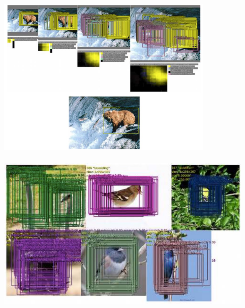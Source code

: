 \documentclass[xetex,mathserif,serif,aspectratio=169]{beamer}
\begin{document}
\begin{frame}[fragile] \frametitle{} \oldB \small

\begin{center}
\includegraphics[width=0.8\textwidth]{img/overFeatLocal.jpg}
\end{center}

\end{frame}

\begin{frame}[fragile] \frametitle{} \oldB \small

\begin{center}
\includegraphics[width=0.95\textwidth]{img/overFeatLocalMore.jpg}
\end{center}

\end{frame}

\begin{frame}[fragile] \frametitle{} \oldB \small

\textbf{}

\end{frame}
\end{document}
